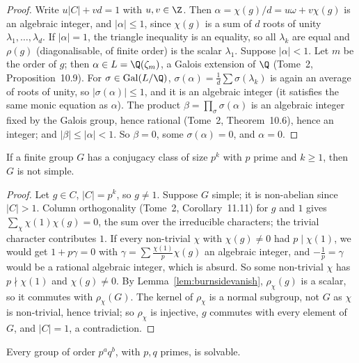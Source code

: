 \begin{proof}
Write $u|C|+vd=1$ with $u,v\in\Z$. Then $\alpha=\chi(g)/d=u\omega+v\chi(g)$ is an algebraic integer, and $|\alpha|\le1$, since $\chi(g)$ is a sum of $d$ roots of unity $\lambda_1,\dots,\lambda_d$. If $|\alpha|=1$, the triangle inequality
is an equality, so all $\lambda_k$ are equal and $\rho(g)$ (diagonalisable, of finite order) is the scalar $\lambda_1$. Suppose $|\alpha|<1$. Let $m$ be the order of $g$; then $\alpha\in L=\Q(\zeta_m)$, a Galois extension of $\Q$
(Tome~2, Proposition~10.9). For $\sigma\in\operatorname{Gal}(L/\Q)$, $\sigma(\alpha)=\frac1d\sum\sigma(\lambda_k)$ is again an average of roots of unity, so $|\sigma(\alpha)|\le1$, and it is an algebraic integer (it satisfies the same monic
equation as $\alpha$). The product $\beta=\prod_\sigma\sigma(\alpha)$ is an algebraic integer fixed by the Galois group, hence rational (Tome~2, Theorem~10.6), hence an integer; and $|\beta|\le|\alpha|<1$. So $\beta=0$, some
$\sigma(\alpha)=0$, and $\alpha=0$.
\end{proof}

\begin{proposition}\label{prop:primepowerclass}
If a finite group $G$ has a conjugacy class of size $p^k$ with $p$ prime and $k\ge1$, then $G$ is not simple.
\end{proposition}

\begin{proof}
Let $g\in C$, $|C|=p^k$, so $g\ne1$. Suppose $G$ simple; it is non-abelian since $|C|>1$. Column orthogonality (Tome~2, Corollary~11.11) for $g$ and $1$ gives $\sum_\chi\chi(1)\chi(g)=0$, the sum over the irreducible
characters; the trivial character contributes $1$. If every non-trivial $\chi$ with $\chi(g)\ne0$ had $p\mid\chi(1)$, we would get $1+p\gamma=0$ with $\gamma=\sum\frac{\chi(1)}p\chi(g)$ an algebraic integer, and $-\frac1p=\gamma$
would be a rational algebraic integer, which is absurd. So some non-trivial $\chi$ has $p\nmid\chi(1)$ and $\chi(g)\ne0$. By Lemma~\ref{lem:burnsidevanish}, $\rho_\chi(g)$ is a scalar, so it commutes with $\rho_\chi(G)$. The kernel of $\rho_\chi$ is
a normal subgroup, not $G$ as $\chi$ is non-trivial, hence trivial; so $\rho_\chi$ is injective, $g$ commutes with every element of $G$, and $|C|=1$, a contradiction.
\end{proof}

\begin{theorem}[Burnside, 1904]\label{thm:burnsidepq}
Every group of order $p^aq^b$, with $p,q$ primes, is solvable.
\end{theorem}

